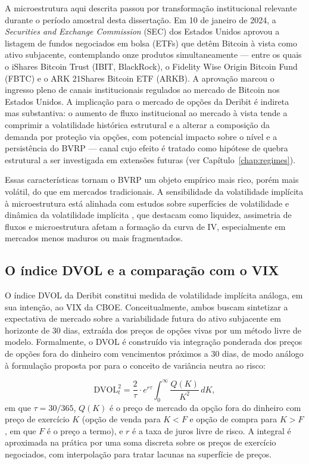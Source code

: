 A microestrutura aqui descrita passou por transformação institucional relevante durante o período amostral desta dissertação. Em 10 de janeiro de 2024, a \textit{Securities and Exchange Commission} (SEC) dos Estados Unidos aprovou a listagem de fundos negociados em bolsa (ETFs) que detêm Bitcoin à vista como ativo subjacente, contemplando onze produtos simultaneamente --- entre os quais o iShares Bitcoin Trust (IBIT, BlackRock), o Fidelity Wise Origin Bitcoin Fund (FBTC) e o ARK 21Shares Bitcoin ETF (ARKB). A aprovação marcou o ingresso pleno de canais institucionais regulados ao mercado de Bitcoin nos Estados Unidos. A implicação para o mercado de opções da Deribit é indireta mas substantiva: o aumento de fluxo institucional ao mercado à vista tende a comprimir a volatilidade histórica estrutural e a alterar a composição da demanda por proteção via opções, com potencial impacto sobre o nível e a persistência do BVRP --- canal cujo efeito é tratado como hipótese de quebra estrutural a ser investigada em extensões futuras (ver Capítulo~\ref{chap:regimes}).

Essas características tornam o BVRP um objeto empírico mais rico, porém mais
volátil, do que em mercados tradicionais. A sensibilidade da volatilidade
implícita à microestrutura está alinhada com estudos sobre superfícies de
volatilidade e dinâmica da volatilidade implícita \citep{gatheral2011volsurface,
bakshi2003dynamicsIV}, que destacam como liquidez, assimetria de fluxos e
microestrutura afetam a formação da curva de IV, especialmente em mercados menos
maduros ou mais fragmentados.

\subsection{O índice DVOL e a comparação com o VIX}
\label{sec:cap2-dvol}

O índice DVOL da Deribit constitui medida de volatilidade implícita análoga, em sua intenção, ao VIX da CBOE. Conceitualmente, ambos buscam sintetizar a expectativa de mercado sobre a variabilidade futura do ativo subjacente em horizonte de 30 dias, extraída dos preços de opções vivas por um método livre de modelo. Formalmente, o DVOL é construído via integração ponderada dos preços de opções fora do dinheiro com vencimentos próximos a 30 dias, de modo análogo à formulação proposta por \citet{carr2009variance} para o conceito de variância neutra ao risco:

\begin{equation}
\text{DVOL}_t^2 = \frac{2}{\tau} \cdot e^{r\tau} \int_0^{\infty} \frac{Q(K)}{K^2} \, dK,
\label{eq:dvol-formula}
\end{equation}
em que $\tau = 30/365$, $Q(K)$ é o preço de mercado da opção fora do dinheiro com preço de exercício $K$ (opção de venda para $K < F$ e opção de compra para $K > F$, em que $F$ é o preço a termo), e $r$ é a taxa de juros livre de risco. A integral é aproximada na prática por uma soma discreta sobre os preços de exercício negociados, com interpolação para tratar lacunas na superfície de preços.

